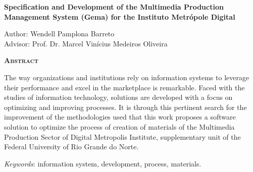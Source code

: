 \begin{center}
	{\Large{\textbf{Specification and Development of the Multimedia Production Management System (Gema) for the Instituto Metrópole Digital}}}
\end{center}

\vspace{1cm}

\begin{flushright}
	Author: Wendell Pamplona Barreto\\
	Advisor: Prof. Dr. Marcel Vinícius Medeiros Oliveira
\end{flushright}

\vspace{1cm}

\begin{center}
	\Large{\textsc{\textbf{Abstract}}}
\end{center}

\noindent The way organizations and institutions rely on information systems to leverage their performance and excel in the marketplace is remarkable. Faced with the studies of information technology, solutions are developed with a focus on optimizing and improving processes. It is through this pertinent search for the improvement of the methodologies used that this work proposes a software solution to optimize the process of creation of materials of the Multimedia Production Sector of Digital Metropolis Institute, supplementary unit of the Federal University of Rio Grande do Norte.

\noindent\textit{Keywords}: information system, development, process, materials.